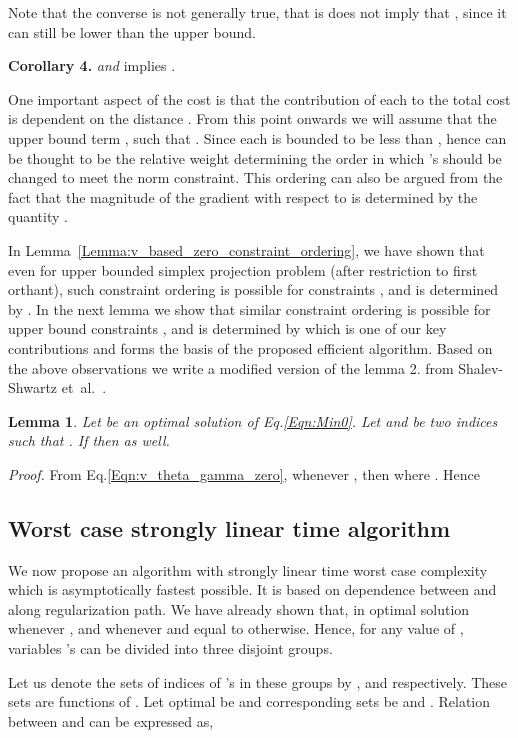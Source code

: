 \documentclass{article}
\newtheorem{lemma}{Lemma}
\def\etal{{et~al.}}
\begin{document}
Note that the converse is not generally true, that is  does not imply that , since it can still be lower than the upper bound.

\textbf{Corollary 4.}\label{Cor:x_eq_b}  \textit{and}  implies .

One important aspect of the cost  is that the contribution of each  to the total cost is dependent on the distance . From this point onwards we will assume that the upper bound term , such that . Since each  is bounded to be less than , hence  can be thought to be the relative weight determining the order in which 's should be changed to meet the norm constraint. This ordering can also be argued from the fact that the magnitude of the gradient with respect to  is determined by the quantity .

In Lemma~\ref{Lemma:v_based_zero_constraint_ordering}, we have shown that even for upper bounded simplex projection problem (after restriction to first orthant), such constraint ordering is possible for constraints , and is determined by .
In the next lemma we show that similar constraint ordering is possible for upper bound constraints , and is determined by  which is one of our key contributions and forms the basis of the proposed efficient algorithm. Based on the above observations we write a modified version of the lemma 2. from Shalev-Shwartz \etal~\cite{ShalevShwartz06}.
\begin{lemma}\label{Lemma:ub_constraint_order}
Let  be an optimal solution of Eq.\eqref{Eqn:Min0}. Let  and  be two indices such that . If  then  as well.
\end{lemma}
\emph{Proof.} From Eq.\eqref{Eqn:v_theta_gamma_zero}, whenever , then  where . Hence




\subsection{Worst case strongly linear time algorithm}
We now propose an algorithm with strongly linear time worst case complexity which is asymptotically fastest possible. It is based on dependence between  and  along regularization path. We have already shown that, in optimal solution  whenever , and  whenever  and equal to  otherwise. Hence, for any value of , variables 's can be divided into three disjoint groups.

Let us denote the sets of indices of 's in these groups by ,  and  respectively. These sets are functions of . Let optimal  be  and corresponding sets be   and . Relation between  and  can be expressed as,
\end{document}
